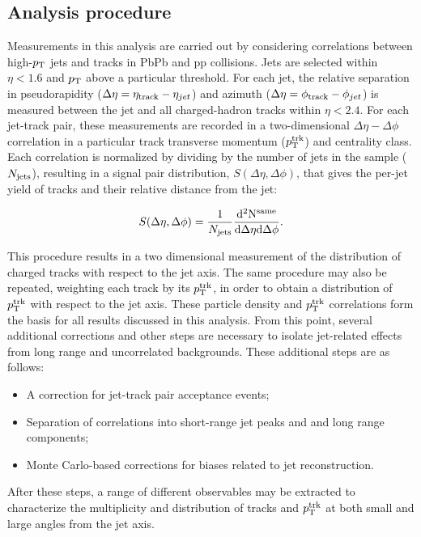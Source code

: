 
\subsection{Analysis procedure}

Measurements in this analysis are carried out by considering correlations between high-$p_{\rm T}$ jets and tracks in PbPb and pp collisions.  Jets are selected within $\eta < 1.6$ and $p_{\rm T}$ above a particular threshold.  For each jet, the relative separation in pseudorapidity ($\Delta\eta = \eta_{\rm track} - \eta_{jet}$) and azimuth ($\Delta\eta = \phi_{\rm track} - \phi_{jet}$) is measured between the jet and all charged-hadron tracks within $\eta < 2.4$.  For each jet-track pair, these measurements are recorded in a two-dimensional $\Delta\eta - \Delta\phi$ correlation in a particular track transverse momentum ($p_{\rm T}^{\rm trk}$) and centrality class.  Each correlation is normalized by dividing by the number of jets in the sample ($N_{\rm jets}$), resulting in a signal pair distribution, $S(\Delta\eta,\Delta\phi)$, that gives the per-jet yield of tracks and their relative distance from the jet:

  \begin{equation}
  \label{eq:signal}
  S(\Delta\eta,\Delta\phi) = \frac{1}{N_{\rm jets}}\frac{\rm d^{2} N^{\rm same}}{\rm d\Delta\eta d\Delta\phi}.
  \end{equation}

This procedure results in a two dimensional measurement of the distribution of charged tracks with respect to the jet axis.  The same procedure may also be repeated, weighting each track by its $p_{\rm T}^{\rm trk}$, in order to obtain a distribution of $p_{\rm T}^{\rm trk}$ with respect to the jet axis.  These particle density and $p_{\rm T}^{\rm trk}$ correlations form the basis for all results discussed in this analysis.  From this point, several additional corrections and other steps are necessary to isolate jet-related effects from long range and uncorrelated backgrounds.  These additional steps are as follows: 
\begin{itemize}
\item A correction for jet-track pair acceptance events;
\item Separation of correlations into short-range jet peaks and and long range components;
\item Monte Carlo-based corrections for biases related to jet reconstruction.
\end{itemize}
After these steps, a range of different observables may be extracted to characterize the multiplicity and distribution of tracks and $p_{\rm T}^{\rm trk}$ at both small and large angles from the jet axis.  

